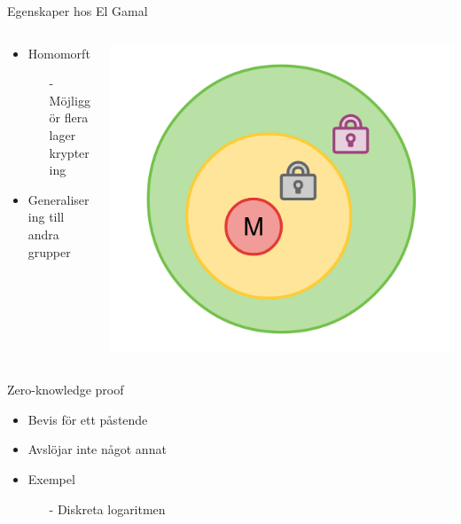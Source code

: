 \begin{frame}{Egenskaper hos El Gamal}

\begin{columns}
	\begin{column}{0.6\textwidth}
		\begin{itemize}
			\item Homomorft
			\begin{itemize}
				\item[-] Möjliggör flera lager kryptering
			\end{itemize}
			\item Generalisering till andra grupper
		\end{itemize}
	\end{column}
	\begin{column}{0.4\textwidth}
		\includegraphics[width=\textwidth]{images/mix6.pdf}
	\end{column}
\end{columns}

\end{frame}

\begin{frame}{Zero-knowledge proof}

\begin{itemize}
\item Bevis för ett påstende
\item Avslöjar inte något annat
\item Exempel
\begin{itemize}
	\item[-] Diskreta logaritmen
\end{itemize}
\end{itemize}

\end{frame}
